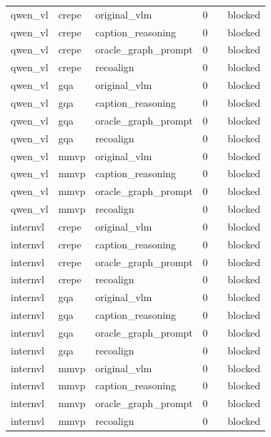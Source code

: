 \begin{table}[t]
\begin{tabular}{llllll}
qwen\_vl & crepe & original\_vlm & 0 &  & blocked \\
qwen\_vl & crepe & caption\_reasoning & 0 &  & blocked \\
qwen\_vl & crepe & oracle\_graph\_prompt & 0 &  & blocked \\
qwen\_vl & crepe & recoalign & 0 &  & blocked \\
qwen\_vl & gqa & original\_vlm & 0 &  & blocked \\
qwen\_vl & gqa & caption\_reasoning & 0 &  & blocked \\
qwen\_vl & gqa & oracle\_graph\_prompt & 0 &  & blocked \\
qwen\_vl & gqa & recoalign & 0 &  & blocked \\
qwen\_vl & mmvp & original\_vlm & 0 &  & blocked \\
qwen\_vl & mmvp & caption\_reasoning & 0 &  & blocked \\
qwen\_vl & mmvp & oracle\_graph\_prompt & 0 &  & blocked \\
qwen\_vl & mmvp & recoalign & 0 &  & blocked \\
internvl & crepe & original\_vlm & 0 &  & blocked \\
internvl & crepe & caption\_reasoning & 0 &  & blocked \\
internvl & crepe & oracle\_graph\_prompt & 0 &  & blocked \\
internvl & crepe & recoalign & 0 &  & blocked \\
internvl & gqa & original\_vlm & 0 &  & blocked \\
internvl & gqa & caption\_reasoning & 0 &  & blocked \\
internvl & gqa & oracle\_graph\_prompt & 0 &  & blocked \\
internvl & gqa & recoalign & 0 &  & blocked \\
internvl & mmvp & original\_vlm & 0 &  & blocked \\
internvl & mmvp & caption\_reasoning & 0 &  & blocked \\
internvl & mmvp & oracle\_graph\_prompt & 0 &  & blocked \\
internvl & mmvp & recoalign & 0 &  & blocked \\
\bottomrule
\end{tabular}
\end{table}

